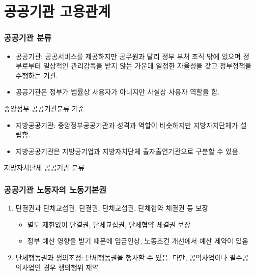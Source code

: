 \documentclass[aspectratio=169,xcolor=dvipsnames,handout]{beamer}
\begin{document}
\section{공공기관 고용관계}
\begin{frame}[allowframebreaks]
    \frametitle{공공기관 분류}
    \begin{itemize}[<+->]
        \item 공공기관: 공공서비스를 제공하지만 공무원과 달리 정부 부처 조직 밖에 있으며 정부로부터 일상적인 관리감독을 받지 않는 가운데 일정한 자율성을 갖고 정부정책을 수행하는 기관. 
        \item 공공기관은 정부가 법률상 사용자가 아니지만 사실상 사용자 역할을 함.  
    \end{itemize}
    \begin{table}
        \centering
        \resizebox{.3\textwidth}{!}{\relax
            
        }
        \caption{중앙정부 공공기관분류 기준}
    \end{table}
    \framebreak%
    \begin{itemize}[<+->]
        \item 지방공공기관: 중앙정부공공기관과 성격과 역할이 비슷하지만 지방자치단체가 설립함.
        \item 지방공공기관은 지방공기업과 지방자치단체 출자출연기관으로 구분할 수 있음.
    \end{itemize}
    \begin{table}
        \centering
        \resizebox{.3\textwidth}{!}{\relax
            
        }
        \caption{지방자치단체 공공기관 분류}
    \end{table}
\end{frame}

\begin{frame}[allowframebreaks]
    \frametitle{공공기관 노동자의 노동기본권}
    \begin{enumerate}[<+->]
        \item 단결권과 단체교섭권: 단결권, 단체교섭권, 단체협약 체결권 등 보장
        \begin{itemize}
            \item 별도 제한없이 단결권, 단체교섭권, 단체협약 체결권 보장
            \item 정부 예산 영향을 받기 때문에 임금인상, 노동조건 개선에서 예산 제약이 있음
        \end{itemize}
        \item 단체행동권과 쟁의조정: 단체행동권을 행사할 수 있음. 다만, 공익사업이나 필수공익사업인 경우 쟁의행위 제약
    \end{enumerate}
\end{frame}
\end{document}

